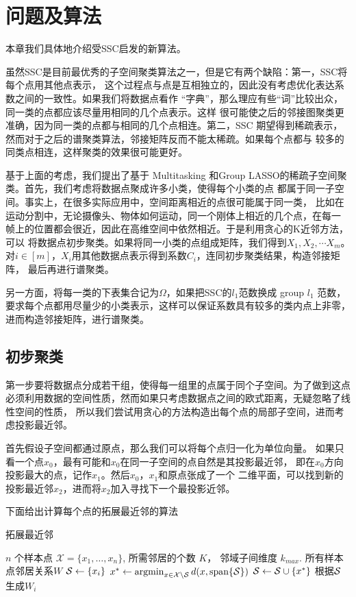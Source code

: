 \documentclass[main]{subfiles}
\begin{document}
\chapter{问题及算法}\label{chp:prob_setup}
本章我们具体地介绍受SSC启发的新算法。

虽然SSC是目前最优秀的子空间聚类算法之一，但是它有两个缺陷：第一，SSC将每个点用其他点表示，
这个过程点与点是互相独立的，因此没有考虑优化表达系数之间的一致性。如果我们将数据点看作
“字典”，那么理应有些“词”比较出众，同一类的点都应该尽量用相同的几个点表示。这样
很可能使之后的邻接图聚类更准确，因为同一类的点都与相同的几个点相连。第二，SSC
期望得到稀疏表示，然而对于之后的谱聚类算法，邻接矩阵反而不能太稀疏。如果每个点都与
较多的同类点相连，这样聚类的效果很可能更好。

基于上面的考虑，我们提出了基于 Multitasking 和Group
LASSO的稀疏子空间聚类。首先，我们考虑将数据点聚成许多小类，使得每个小类的点
都属于同一子空间。事实上，在很多实际应用中，空间距离相近的点很可能属于同一类，
比如在运动分割中，无论摄像头、物体如何运动，同一个刚体上相近的几个点，在每一
帧上的位置都会很近，因此在高维空间中依然相近。于是利用贪心的K近邻方法，可以
将数据点初步聚类。如果将同一小类的点组成矩阵，我们得到$X_1, X_2, \cdots X_m$。
对$i\in [m]$，$X_i$用其他数据点表示得到系数$C_i$，连同初步聚类结果，构造邻接矩阵，
最后再进行谱聚类。

另一方面，将每一类的下表集合记为$\Omega$，如果把SSC的$l_1$范数换成 group $l_1$
范数，要求每个点都用尽量少的小类表示，这样可以保证系数具有较多的类内点上非零，
进而构造邻接矩阵，进行谱聚类。

\section{初步聚类} 

第一步要将数据点分成若干组，使得每一组里的点属于同个子空间。为了做到这点
必须利用数据的空间性质，然而如果只考虑数据点之间的欧式距离，无疑忽略了线性空间的性质，
所以我们尝试用贪心的方法构造出每个点的局部子空间，进而考虑投影最近邻。

首先假设子空间都通过原点，那么我们可以将每个点归一化为单位向量。
如果只看一个点$x_0$，最有可能和$x_0$在同一子空间的点自然是其投影最近邻，
即在$x_0$方向投影最大的点，记作$x_1$。然后$x_0$，$x_1$和原点张成了一个
二维平面，可以找到新的投影最近邻$x_2$，进而将$x_2$加入寻找下一个最投影近邻。

下面给出计算每个点的拓展最近邻的算法
\begin{algorithm} \caption{拓展最近邻}
  \begin{algorithmic} \label{alg:nsn}
    \Require $n$ 个样本点 $\mathcal{X} = \{x_1,\ldots,x_n\}$, 所需邻居的个数
    $K$， 邻域子间维度 $k_{max}$.
    \Ensure 所有样本点邻居关系$W$
     
      \State $\mathcal{S} \gets \{x_i\}$ 
       
        \State $x^* \gets \operatorname*{argmin}_{x \in \mathcal{X} \setminus \mathcal{S}} d(x,\mathrm{span}\{\mathcal{S}\})$
          \State $\mathcal{S} \gets \mathcal{S} \cup \{x^*\}$
        \EndIf
      \EndFor
      \State 根据$\mathcal{S}$生成$W_i$
    \EndFor
  \end{algorithmic}
\end{algorithm}
\end{document}
